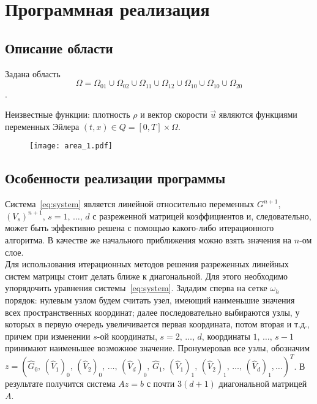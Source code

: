 \section{Программная реализация}

\subsection{Описание области}
Задана область $$\Omega = \Omega_{01} \cup \Omega_{02} \cup \Omega_{11} \cup \Omega_{12} \cup \Omega_{10} \cup \Omega_{10} \cup \Omega_{20} $$.

Неизвестные функции: плотность $\rho$ и вектор скорости $\vec{u}$ являются функциями переменных Эйлера $(t, x) \in Q = [0, T] \times \Omega$.


\begin{figure}[h!] \centering
	\texttt{[image: area\_1.pdf]}
\end{figure}


\subsection{Особенности реализации программы}
Система~\eqref{eq:system} является линейной относительно переменных $G^{n+1}$, $(V_s)^{n+1}$, $s = 1, \, \ldots, \, d$ с разреженной матрицей коэффициентов и, следовательно, может быть эффективно решена с помощью какого-либо итерационного алгоритма. В качестве же начального приближения можно взять значения на $n$-ом слое. \\

Для использования итерационных методов решения разреженных линейных систем матрицы стоит делать ближе к диагональной. Для этого необходимо упорядочить уравнения системы~\eqref{eq:system}. Зададим сперва на сетке $\omega_h$ порядок: нулевым узлом будем считать узел, имеющий наименьшие значения всех пространственных координат; далее последовательно выбираются узлы, у которых в первую очередь увеличивается первая координата, потом вторая и т.д., причем при изменении $s$-ой координаты, $s = 2, \, \ldots, \, d$, координаты $1, \, \ldots, \, s - 1$ принимают наименьшее возможное значение. Пронумеровав все узлы, обозначим $z = (\widehat{G}_0, \, (\widehat{V}_1)_0, \, (\widehat{V}_2)_0, \, \ldots, \, (\widehat{V}_d)_0, \, \widehat{G}_1, \, (\widehat{V}_1)_1, \, (\widehat{V}_2)_1, \, \ldots, \, (\widehat{V}_d)_1, \ldots)^T$. 
В результате получится система $Az=b$ с почти $3(d+1)$ диагональной матрицей $A$. \\

